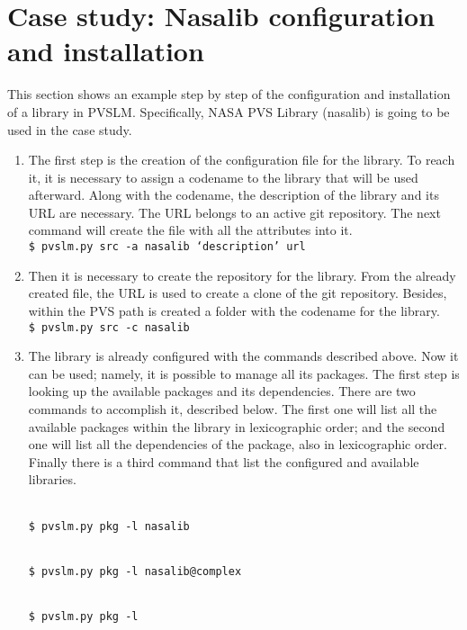 \section{Case study: Nasalib configuration and installation}
\label{ssec:nasalib}

This section shows an example step by step of the configuration and installation of a library in PVSLM. Specifically, NASA PVS Library (nasalib) is going to be used in the case study.

\begin{enumerate}
\item 
  The first step is the creation of the configuration file for the library. To reach it, it is necessary to assign a codename to the library that will be used afterward. Along with the codename, the description of the library and its URL are necessary. The URL belongs to an active git repository. The next command will create the file with all the attributes into it.\\

  \texttt {\$ pvslm.py src -a nasalib `description' url\\}

\item
  Then it is necessary to create the repository for the library. From the already created file, the URL is used to create a clone of the git repository. Besides, within the PVS path is created a folder with the codename for the library.\\

  \texttt {\$ pvslm.py src -c nasalib\\}

\item 
  The library is already configured with the commands described above. Now it can be used; namely, it is possible to manage all its packages. The first step is looking up the available packages and its dependencies. There are two commands to accomplish it, described below. The first one will list all the available packages within the library in lexicographic order; and the second one will list all the dependencies of the package, also in lexicographic order. Finally there is a third command that list the configured and available libraries.
  
  \texttt {\\\$ pvslm.py pkg -l nasalib}
  
  \texttt {\\\$ pvslm.py pkg -l nasalib@complex}
  
  \texttt {\\\$ pvslm.py pkg -l\\}


\end{enumerate}
